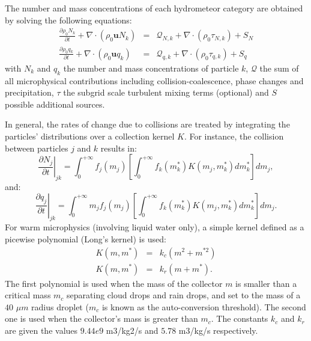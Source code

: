 \documentclass[12pt,A4,french]{article}
\begin{document}
\begin{description}
The number and mass concentrations of each hydrometeor category are obtained by solving the following equations:
\begin{eqnarray}
\frac{\partial \rho_0 N_k}{\partial t} + \nabla\cdot\left(\rho_0 \mathbf{u} N_k\right) &=& {\mathcal Q}_{N,k} + \nabla\cdot\left(\rho_0 \tau_{N,k}\right) + S_N \\
\frac{\partial \rho_0 q_k}{\partial t} + \nabla\cdot\left(\rho_0 \mathbf{u} q_k\right) &=& {\mathcal Q}_{q,k} + \nabla\cdot\left(\rho_0 \tau_{q,k}\right) + S_q \label{qk}
\end{eqnarray}
with $N_k$ and $q_k$ the number and mass concentrations of particle $k$, ${\mathcal Q}$ the sum of all microphysical contributions including collision-coalescence, phase changes and precipitation, $\tau$ the subgrid scale turbulent mixing terms (optional) and $S$ possible additional sources. 

In general, the rates of change due to collisions are treated by integrating the particles' distributions over a collection kernel $K$. For instance, the collision between particles $j$ and $k$ results in:
\begin{equation}
\left.\frac{\partial N_j}{\partial t}\right|_{jk} = \int_{0}^{+\infty}f_j\left(m_j\right)\left[\int_{0}^{+\infty}f_k\left(m_k^{*}\right)K\left(m_j,m_k^{*}\right)dm_k^{*}\right] dm_j,
\label{number_int}
\end{equation}
and: 
\begin{equation}
\left.\frac{\partial q_j}{\partial t}\right|_{jk} = \int_{0}^{+\infty}m_j f_j\left(m_j\right)\left[\int_{0}^{+\infty}f_k\left(m_k^{*}\right)K\left(m_j,m_k^{*}\right)dm_k^{*}\right] dm_j.
\label{mass_int}
\end{equation}
 For warm microphysics (involving liquid water only), a simple kernel defined as a picewise polynomial (Long's kernel) is used:
\begin{eqnarray}
K\left(m,m^{*}\right) &=& k_{c}\left(m^{2} + m^{*2}\right) \\
K\left(m,m^{*}\right) &=& k_{r}\left(m + m^{*}\right).
\end{eqnarray}
The first polynomial is used when the mass of the collector $m$ is smaller than a critical mass $m_{c}$ separating cloud drops and rain drops, and set to the mass of a $40$ $\mu m$ radius droplet ($m_c$ is known as the auto-conversion threshold). The second one is used when the collector's mass is greater than $m_{c}$. The constants $k_{c}$ and $k_{r}$ are given the values $9.44e9$ m3/kg2/s and $5.78$ m3/kg/s respectively. 


\end{description}
\end{document}
